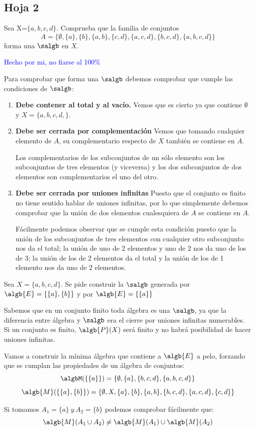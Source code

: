 \subsection{Hoja 2}
\begin{problem}[1]
Sea X=$\{a,b,c,d\}$. Comprueba que la familia de conjuntos
\[A = \{\emptyset, \{a\}, \{b\}, \{a,b\},\{c,d\},\{a,c,d\},\{b,c,d\}, \{a,b,c,d\}\}\]
forma una $\salgb$ en $X$.

\solution
\textcolor{blue}{Hecho por mi, no fiarse al 100\%}

Para comprobar que forma una $\salgb$ debemos comprobar que cumple las condiciones de $\salgb$:

\begin{enumerate}
\item \textbf{Debe contener al total y al vacío.}
Vemos que es cierto ya que contiene $\emptyset$ y $X=\{a,b,c,d,\}$.

\item \textbf{Debe ser cerrada por complementación}
Vemos que tomando cualquier elemento de $A$, su complementario respecto de $X$ también se contiene en $A$.

Los complementarios de los subconjuntos de un sólo elemento son los subconjuntos de tres elementos (y viceversa) y los dos subconjuntos de dos elementos son complementarios el uno del otro.

\item \textbf{Debe ser cerrada por uniones infinitas}
Puesto que el conjunto es finito no tiene sentido hablar de uniones infinitas, por lo que simplemente debemos comprobar que la unión de dos elementos cualesquiera de $A$ se contiene en $A$.

Fácilmente podemos observar que se cumple esta condición puesto que la unión de los subconjuntos de tres elementos con cualquier otro subconjunto nos da el total; la unión de uno de 2 elementos y uno de 2 nos da uno de los de 3; la unión de los de 2 elementos da el total y la unión de los de 1 elemento nos da uno de 2 elementos.
\end{enumerate}

\end{problem}
\begin{problem}[2]
Sea $X=\{a,b,c,d\}$. Se pide construir la $\salgb$ generada por $\algb{E}=\{\{a\},\{b\}\}$ y por $\algb{E}=\{\{a\}\}$

\solution
Sabemos que en un conjunto finito toda álgebra es una $\salgb$, ya que la diferencia entre álgebra y $\salgb$ era el cierre por uniones infinitas numerables. Si un conjunto es finito, $\algb{P}(X)$ será finito y no habrá posibilidad de hacer uniones infinitas.

Vamos a construir la mínima álgebra que contiene a $\algb{E}$ a pelo, forzando que se cumplan las propiedades de un álgebra de conjuntos:
\[\algbM(\{\{a\}\}) = \{\emptyset, \{a\}, \{b,c,d\}, \{a,b,c,d\}\}\]
\[\algb{M}(\{\{a\},\{b\}\})=\{\emptyset, X, \{a\}, \{b\}, \{a,b\}, \{b,c,d\}, \{a,c,d\}, \{c,d\}\}\]

\obs Si tomamos $A_1=\{a\} \ y \ A_2 = \{b\}$ podemos comprobar fácilmente que:
\[\algb{M}(A_1 \cup A_2) \neq \algb{M}(A_1) \cup \algb{M}(A_2)\]
\end{problem}

